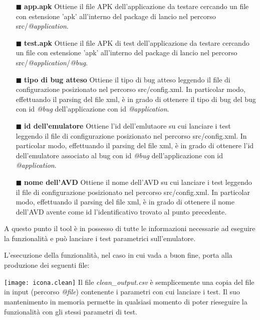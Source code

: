 \begin{itemize} [nosep]

\item [$\blacksquare$]\textbf{app.apk} \newline
Ottiene il file APK dell'applicazione da testare cercando un file con estensione 'apk' all'interno del package di lancio nel percorso  src/\emph{@application}.
\item [$\blacksquare$]\textbf{test.apk} \newline
Ottiene il file APK di test dell'applicazione da testare cercando un file con estensione 'apk' all'interno del package di lancio nel percorso  src/\emph{@application}/\emph{@bug}.
\item [$\blacksquare$]\textbf{tipo di bug atteso} \newline
Ottiene il tipo di bug atteso leggendo il file di configurazione posizionato nel percorso src/config.xml. In particolar modo, effettuando il parsing del file xml, è in grado di ottenere il tipo di bug del bug con id \emph{@bug} dell'applicazione con id \emph{@application}.
\item [$\blacksquare$]\textbf{id dell'emulatore } \newline
Ottiene l'id dell'emlutaore su cui lanciare i test leggendo il file di configurazione posizionato nel percorso src/config.xml. In particolar modo, effettuando il parsing del file xml, è in grado di ottenere l'id dell'emulatore associato al bug con id \emph{@bug} dell'applicazione con id \emph{@application}.
\item [$\blacksquare$]\textbf{nome dell'AVD} \newline
Ottiene il nome dell'AVD su cui lanciare i test leggendo il file di configurazione posizionato nel percorso src/config.xml. In particolar modo, effettuando il parsing del file xml, è in grado di ottenere il nome dell'AVD avente come id l'identificativo trovato al punto precedente.
\end{itemize}
\medskip 
\noindent A questo punto il tool è in possesso di tutte le informazioni necessarie ad eseguire la funzionalità e può lanciare i test parametrici sull'emulatore. 
\smallskip  \newline 

\noindent L'esecuzione della funzionalità, nel caso in cui vada a buon fine, porta alla produzione dei seguenti file:

\begin{tcolorbox}[colback=white, colframe=lightgray]
	 \texttt{[image: icona.clean]} \newline
Il file \emph{clean\_output.csv} è semplicemente una copia del file in input (percorso \emph{@file}) contenente i parametri con cui lanciare i test. Il suo mantenimento in memoria permette in qualsiasi momento di poter rieseguire la funzionalità con gli stessi parametri di test.
\end{tcolorbox}

